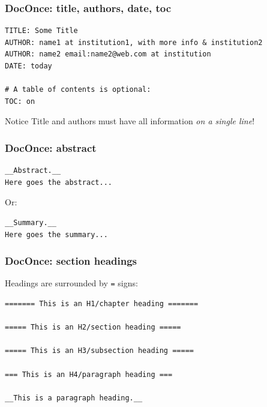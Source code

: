 \documentclass{beamer}
\begin{document}
\begin{frame}
\frametitle{DocOnce: title, authors, date, toc}

\begin{verbatim}
TITLE: Some Title
AUTHOR: name1 at institution1, with more info & institution2
AUTHOR: name2 email:name2@web.com at institution
DATE: today

# A table of contents is optional:
TOC: on

\end{verbatim}


\begin{block}{Notice}
Title and authors must have all information \emph{on a single line}!
\end{block}
\end{frame}

\begin{frame}
\frametitle{DocOnce: abstract}

\begin{verbatim}
__Abstract.__
Here goes the abstract...

\end{verbatim}


Or:



\begin{verbatim}
__Summary.__
Here goes the summary...

\end{verbatim}
\end{frame}

\begin{frame}
\frametitle{DocOnce: section headings}

Headings are surrounded by \texttt{=} signs:










\begin{verbatim}
======= This is an H1/chapter heading =======

===== This is an H2/section heading =====

===== This is an H3/subsection heading =====

=== This is an H4/paragraph heading ===

__This is a paragraph heading.__

\end{verbatim}
\end{frame}
\end{document}
